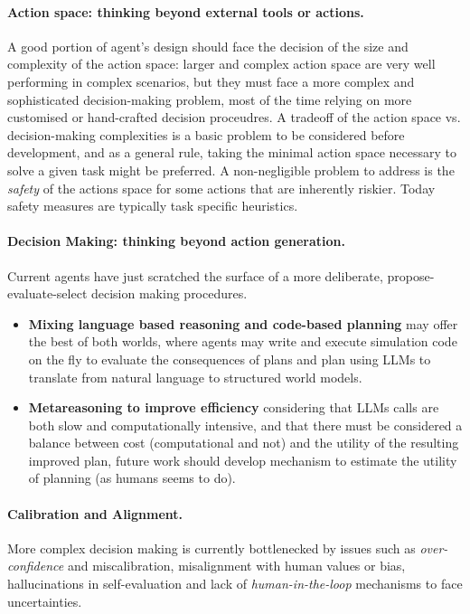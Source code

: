 \paragraph{Action space: thinking beyond external tools or actions.} A good
portion of agent's design should face the decision of the size and complexity
of the action space: larger and complex action space are very well performing
in complex scenarios, but they must face a more complex and sophisticated
decision-making problem, most of the time relying on more customised or
hand-crafted decision proceudres. A tradeoff of the action space vs.
decision-making complexities is a basic problem to be considered before
development, and as a general rule, taking the minimal action space necessary
to solve a given task might be preferred.
A non-negligible problem to address is the \emph{safety} of the actions space
for some actions that are inherently riskier. Today safety measures are
typically task specific heuristics.

\paragraph{Decision Making: thinking beyond action generation.} Current agents
have just scratched the surface of a more deliberate, propose-evaluate-select
decision making procedures.

\begin{itemize}
    \item \textbf{Mixing language based reasoning and code-based planning} may
        offer the best of both worlds, where agents may write and execute
        simulation code on the fly to evaluate the consequences of plans and
        plan using \ac{LLM}s to translate from natural language to structured
        world models.

    \item \textbf{Metareasoning to improve efficiency} considering that
        \ac{LLM}s calls are both slow and computationally intensive, and that
        there must be considered a balance between cost (computational and not)
        and the utility of the resulting improved plan, future work should
        develop mechanism to estimate the utility of planning (as humans seems
        to do).
\end{itemize} 

\paragraph{Calibration and Alignment.} More complex decision making is
currently bottlenecked by issues such as \emph{over-confidence} and
miscalibration, misalignment with human values or bias, hallucinations in
self-evaluation and lack of \emph{human-in-the-loop} mechanisms to face
uncertainties.

